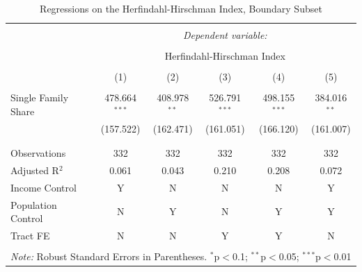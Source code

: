 \documentclass[11pt]{article}
\begin{document}
\begin{table}[!htbp] \centering 
  \caption{Regressions on the Herfindahl-Hirschman Index, Boundary Subset} 
  \label{tab:HHI_Causal} 
\begin{tabular}{@{\extracolsep{5pt}}lccccc} 
\\[-1.8ex]\hline 
\hline \\[-1.8ex] 
 & \multicolumn{5}{c}{\textit{Dependent variable:}} \\ 
\cline{2-6} 
\\[-1.8ex] & \multicolumn{5}{c}{Herfindahl-Hirschman Index} \\ 
\\[-1.8ex] & (1) & (2) & (3) & (4) & (5)\\ 
\hline \\[-1.8ex] 
 Single Family Share & 478.664$^{***}$ & 408.978$^{**}$ & 526.791$^{***}$ & 498.155$^{***}$ & 384.016$^{**}$ \\ 
  & (157.522) & (162.471) & (161.051) & (166.120) & (161.007) \\ 
  & & & & & \\ 
\hline \\[-1.8ex] 
Observations & 332 & 332 & 332 & 332 & 332 \\ 
Adjusted R$^{2}$ & 0.061 & 0.043 & 0.210 & 0.208 & 0.072 \\ 
\hline
Income Control & Y & N & N & N & Y\\
Population Control & N & Y & N & Y & Y\\
Tract FE & N & N & Y & Y & N\\
\hline 
\hline \\[-1.8ex] 
\multicolumn{6}{l}{\textit{Note:} Robust Standard Errors in Parentheses. $^{*}$p$<$0.1; $^{**}$p$<$0.05; $^{***}$p$<$0.01} \\
\end{tabular} 
\end{table} 
\end{document}
